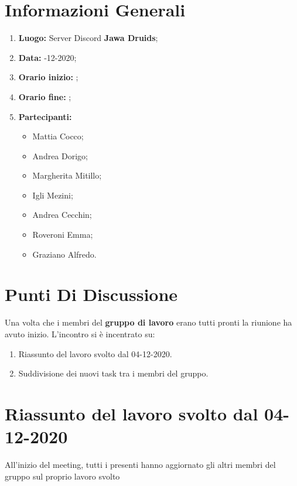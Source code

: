 \newpage
	\section{Informazioni Generali}
	\begin{enumerate}
		\item \textbf{Luogo:} \normalfont Server Discord \textbf{Jawa Druids};
		\item \textbf{Data:} -12-2020;
		\item \textbf{Orario inizio:} ;
		\item \textbf{Orario fine:} ;
		\item \textbf{Partecipanti:}
		\begin{itemize}
			\item Mattia Cocco; 
			\item Andrea Dorigo;
			\item Margherita Mitillo;
			\item Igli Mezini;
			\item Andrea Cecchin;
			\item Roveroni Emma;
			\item Graziano Alfredo.
		\end{itemize}
	\end{enumerate}
	\section{Punti Di Discussione}
	Una volta che i membri del \textbf{gruppo di lavoro} erano tutti pronti la riunione ha avuto inizio.
	L'incontro si è incentrato su:
	\begin{enumerate}
		\item Riassunto del lavoro svolto dal 04-12-2020.
		
		\item Suddivisione dei nuovi task tra i membri del gruppo.
		
	\end{enumerate}

	\section{Riassunto del lavoro svolto dal 04-12-2020}
	All'inizio del meeting, tutti i presenti hanno aggiornato gli altri membri del gruppo sul proprio lavoro svolto
	
